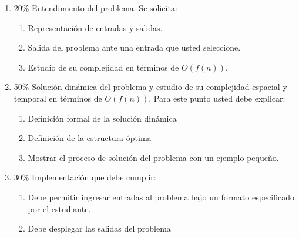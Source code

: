 \documentclass[twocolumn, letterpaper]{article}
\begin{document}
\begin{enumerate}
	\item {20\% Entendimiento del problema. Se solicita:
		\begin{enumerate}
			\item Representación de entradas y salidas.
			\item Salida del problema ante una entrada que usted seleccione.
			\item Estudio de su complejidad en términos de $O(f(n))$.
		\end{enumerate}			
	}
	\item {50\% Solución dinámica del problema y estudio de su complejidad espacial y temporal en términos de $O(f(n))$. Para este punto usted debe explicar:
	\begin{enumerate} 
		\item Definición formal de la solución dinámica
		\item Definición de la estructura óptima
		\item Mostrar el proceso de solución del problema con un ejemplo pequeño.
	\end{enumerate}}
	\item 30\% Implementación que debe cumplir:
\begin{enumerate}
	\item Debe permitir ingresar entradas al problema bajo un formato especificado por el estudiante.
	\item Debe desplegar las salidas del problema
\end{enumerate}	

\end{enumerate}
\end{document}
